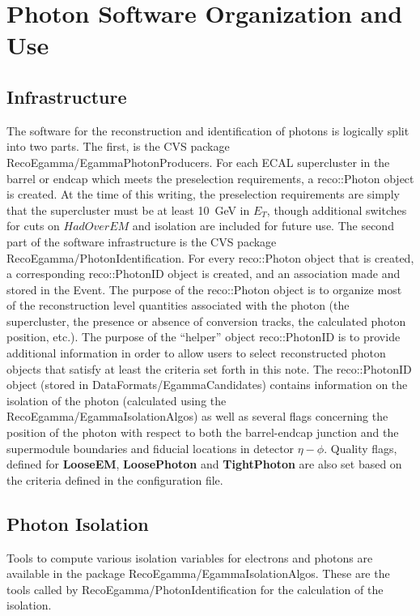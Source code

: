 \documentclass{cmspaper}
\begin{document}
\section{Photon Software Organization and Use}
\subsection{Infrastructure}
The software for the reconstruction and identification of photons is logically
split into two parts.  The first, is the CVS package RecoEgamma/EgammaPhotonProducers.  For each ECAL 
supercluster in the barrel or endcap which meets the preselection requirements, a reco::Photon object 
is created.  At the time of this writing, the preselection requirements are simply that the 
supercluster must be at least 10~GeV in $E_T$, though additional switches for cuts on $HadOverEM$ 
and isolation are included for future use.  The second part of the software infrastructure is the
CVS package RecoEgamma/PhotonIdentification.  For every reco::Photon object that is created, a corresponding
reco::PhotonID object is created, and an association made and stored in the Event.
The purpose of the reco::Photon object is to organize most of the reconstruction level quantities associated
with the photon (the supercluster, the presence or absence of conversion tracks, the calculated photon 
position, etc.).  The purpose of the ``helper'' object reco::PhotonID is to provide additional information
in order to allow users to select reconstructed photon objects that satisfy at least the criteria set
forth in this note.  The reco::PhotonID object (stored in DataFormats/EgammaCandidates) contains information
on the isolation of the photon (calculated using the RecoEgamma/EgammaIsolationAlgos) as well as several
flags concerning the position of the photon with respect to both the barrel-endcap junction and the 
supermodule boundaries and fiducial locations in detector $\eta-\phi$.  Quality flags, defined for {\bf LooseEM}, {\bf LoosePhoton} and {\bf TightPhoton} are also set based on the criteria defined in the configuration file.

\subsection{Photon Isolation}
Tools to compute various isolation variables for electrons and photons are available in the
package RecoEgamma/EgammaIsolationAlgos.  These are the tools called by RecoEgamma/PhotonIdentification for the
calculation of the isolation.
\end{document}
